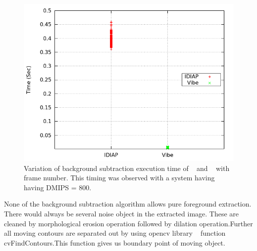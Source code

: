 \documentclass[conference]{IEEEtran}
\begin{document}
\begin{figure}[!h]
\centering
\includegraphics[scale=0.35]{figures/bg_compare}
\caption{Variation of background subtraction execution time of ~\cite{3}
and ~\cite{5} with frame number. This timing was observed with a system
having having DMIPS = 800.}
\label{bg_compare}
\end{figure}

None of the background subtraction algorithm allows pure foreground
extraction. There would always be several noise object in the extracted
image. These are cleaned by morphological erosion operation followed by
dilation operation.Further all moving contours are separated out by
using opencv library ~\cite{12} function cvFindContours.This function
gives us boundary point of moving object.
\end{document}
